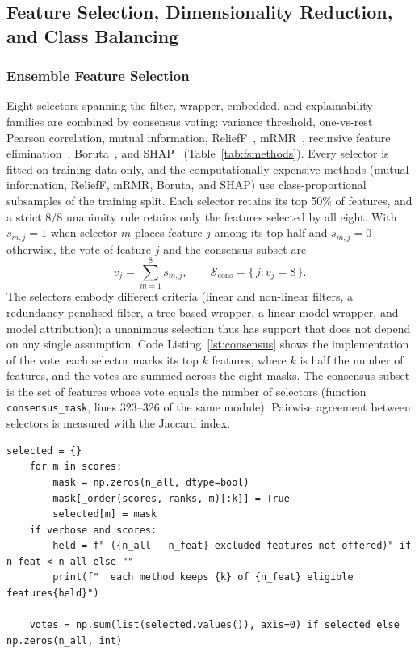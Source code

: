\subsection{Feature Selection, Dimensionality Reduction, and Class Balancing}
\label{sec:chap3Phase3}

\subsubsection{Ensemble Feature Selection}
\label{sec:chap3FeatureSelection}
Eight selectors spanning the filter, wrapper, embedded, and explainability families are combined by consensus voting: variance threshold, one-vs-rest Pearson correlation, mutual information, ReliefF~\cite{li2022relieff}, mRMR~\cite{peng2005mrmr}, recursive feature elimination~\cite{guyon2002rfe}, Boruta~\cite{kursa2010boruta}, and SHAP~\cite{lundberg2017shap} (Table~\ref{tab:fsmethods}). Every selector is fitted on training data only, and the computationally expensive methods (mutual information, ReliefF, mRMR, Boruta, and SHAP) use class-proportional subsamples of the training split. Each selector retains its top 50\% of features, and a strict $8/8$ unanimity rule retains only the features selected by all eight. With $s_{m,j} = 1$ when selector $m$ places feature $j$ among its top half and $s_{m,j} = 0$ otherwise, the vote of feature $j$ and the consensus subset are
\begin{equation}
	v_j = \sum_{m=1}^{8} s_{m,j}, \qquad \mathcal{S}_{\mathrm{cons}} = \{\, j : v_j = 8 \,\}.
	\label{eq:consensus}
\end{equation}
The selectors embody different criteria (linear and non-linear filters, a redundancy-penalised filter, a tree-based wrapper, a linear-model wrapper, and model attribution); a unanimous selection thus has support that does not depend on any single assumption. Code Listing~\ref{lst:consensus} shows the implementation of the vote: each selector marks its top $k$ features, where $k$ is half the number of features, and the votes are summed across the eight masks. The consensus subset is the set of features whose vote equals the number of selectors (function \texttt{consensus\_mask}, lines 323--326 of the same module). Pairwise agreement between selectors is measured with the Jaccard index.

\begin{lstlisting}[style=dasfe, firstnumber=276, caption={Per-selector masks and consensus votes in \texttt{dasfe/selection.py}, lines 276--285 (Equation~(\ref{eq:consensus})).}, label={lst:consensus}]
    selected = {}
    for m in scores:
        mask = np.zeros(n_all, dtype=bool)
        mask[_order(scores, ranks, m)[:k]] = True
        selected[m] = mask
    if verbose and scores:
        held = f" ({n_all - n_feat} excluded features not offered)" if n_feat < n_all else ""
        print(f"  each method keeps {k} of {n_feat} eligible features{held}")

    votes = np.sum(list(selected.values()), axis=0) if selected else np.zeros(n_all, int)
\end{lstlisting}

